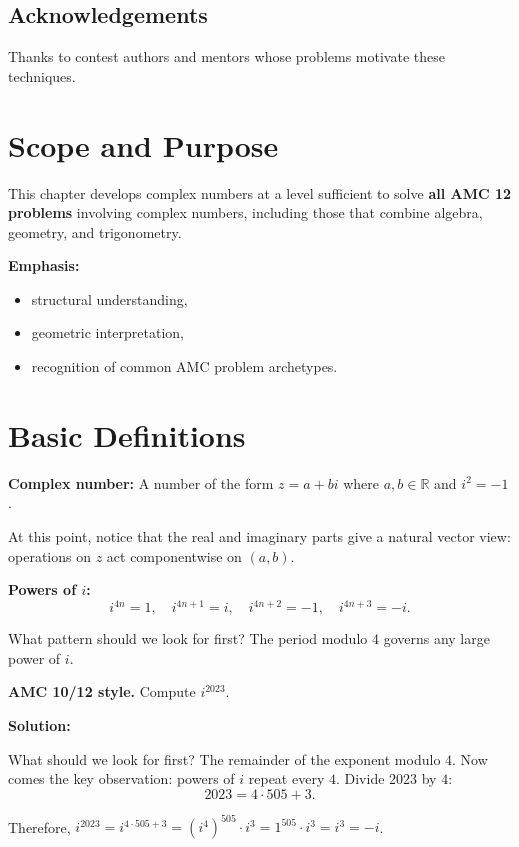 \documentclass[12pt]{extarticle}
\begin{document}
\subsection*{Acknowledgements}
Thanks to contest authors and mentors whose problems motivate these techniques.

\newpage

\section*{Scope and Purpose}
This chapter develops complex numbers at a level sufficient to solve \textbf{all AMC 12 problems} involving complex numbers, including those that combine algebra, geometry, and trigonometry.

\textbf{Emphasis:}
\begin{itemize}
    \item structural understanding,
    \item geometric interpretation,
    \item recognition of common AMC problem archetypes.
\end{itemize}

\section{Basic Definitions}

\textbf{Complex number:} A number of the form $z = a + bi$ where $a,b \in \mathbb{R}$ and $i^2 = -1$.

At this point, notice that the real and imaginary parts give a natural vector view: operations on $z$ act componentwise on $(a,b)$.

\textbf{Powers of $i$:}
\[
 i^{4n}=1,\quad i^{4n+1}=i,\quad i^{4n+2}=-1,\quad i^{4n+3}=-i.
\]

What pattern should we look for first? The period modulo $4$ governs any large power of $i$.

\begin{examplebox}
\textbf{AMC 10/12 style.} Compute $i^{2023}$.
\end{examplebox}

\textbf{Solution:}

What should we look for first? The remainder of the exponent modulo $4$.
Now comes the key observation: powers of $i$ repeat every $4$.
Divide $2023$ by $4$:
\[
2023 = 4 \cdot 505 + 3.
\]

Therefore, $i^{2023} = i^{4 \cdot 505 + 3} = (i^4)^{505} \cdot i^3 = 1^{505} \cdot i^3 = i^3 = -i$.
\end{document}
